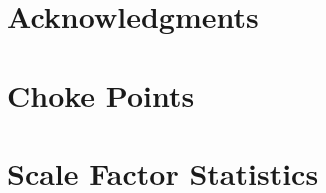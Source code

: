 \documentclass{ldbc}
\begin{document}
\maketitle

\chapter*{Acknowledgments}






















\appendix

\chapter{Choke Points}



\chapter{Scale Factor Statistics}


\end{document}
